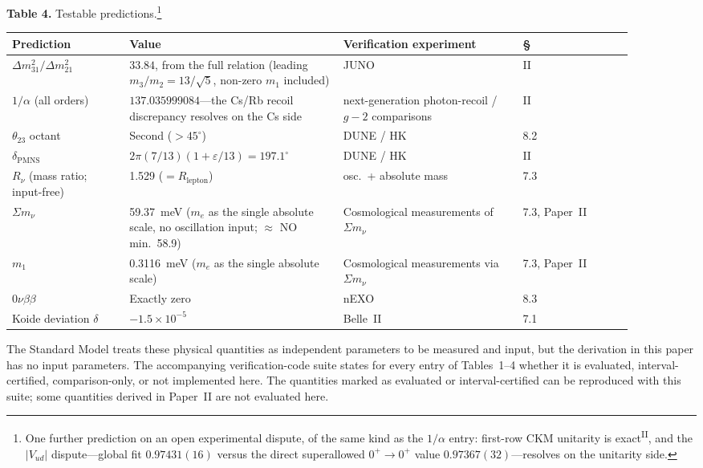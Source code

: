\documentclass[12pt,a4paper]{article}
\newcommand{\PII}{\textsuperscript{\textup{II}}}
\begin{document}
\medskip
{}
\bigskip\noindent\textbf{Table 4.} Testable predictions.\footnote{One further prediction on an open experimental dispute, of the same kind as the $1/\alpha$ entry: first-row CKM unitarity is exact\PII{}, and the $|V_{ud}|$ dispute---global fit $0.97431(16)$ versus the direct superallowed $0^+\to0^+$ value $0.97367(32)$---resolves on the unitarity side.}
\nopagebreak[4]
\begin{center}\footnotesize
\begin{tabular}{@{}p{0.17\linewidth}p{0.31\linewidth}p{0.26\linewidth}p{0.16\linewidth}@{}}
\toprule
Prediction & Value & Verification experiment & \S \\
\midrule
$\Delta m^2_{31}/\Delta m^2_{21}$ & $33.84$, from the full relation (leading $m_3/m_2 = 13/\sqrt{5}$, non-zero $m_1$ included) & JUNO~\cite{juno} & II \\
$1/\alpha$ (all orders) & $137.035999084$---the Cs/Rb recoil discrepancy resolves on the Cs side & next-generation photon-recoil / $g{-}2$ comparisons & II \\
$\theta_{23}$ octant & Second ($>45^\circ$) & DUNE / HK & 8.2 \\
$\delta_\mathrm{PMNS}$ & $2\pi(7/13)(1+\varepsilon/13) = 197.1^\circ$ & DUNE / HK & II \\
$R_\nu$ (mass ratio; input-free) & 1.529 ($= R_\mathrm{lepton}$) & osc.\ + absolute mass & 7.3 \\
$\Sigma m_\nu$ & 59.37~meV ($m_e$ as the single absolute scale, no oscillation input; $\approx$ NO min.\ 58.9) & Cosmological measurements of $\Sigma m_\nu$\footnotemark{} & 7.3, Paper~II \\
$m_1$ & 0.3116~meV ($m_e$ as the single absolute scale) & Cosmological measurements via $\Sigma m_\nu$ & 7.3, Paper~II \\
$0\nu\beta\beta$ & Exactly zero & nEXO~\cite{nexo} & 8.3 \\
Koide deviation $\delta$ & $-1.5 \times 10^{-5}$ & Belle~II~\cite{belleii} & 7.1 \\
\bottomrule
\end{tabular}
\end{center}

\medskip
The Standard Model treats these physical quantities as independent
parameters to be measured and input, but the derivation in this
paper has no input parameters. The accompanying verification-code suite states for every entry of
Tables~1--4 whether it is evaluated, interval-certified,
comparison-only, or not implemented here. The quantities marked as
evaluated or interval-certified can be reproduced with this suite;
some quantities derived in Paper~II are not evaluated here.
\end{document}
